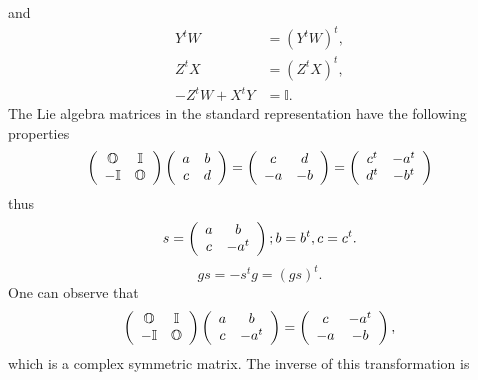 \documentclass[aps,preprint]{revtex4}%
\begin{document}
and
\begin{align}
Y^{t}W  &  =\left(  Y^{t}W\right)  ^{t},\\
Z^{t}X  &  =\left(  Z^{t}X\right)  ^{t},\\
-Z^{t}W+X^{t}Y  &  =\mathbb{I}.
\end{align}
The Lie algebra matrices in the standard representation have the following
properties
\begin{equation}
\left(
\begin{array}
[c]{cc}%
\mathbb{O} & \mathbb{I}\\
-\mathbb{I} & \mathbb{O}%
\end{array}
\right)  \left(
\begin{array}
[c]{cc}%
a & b\\
c & d
\end{array}
\right)  =\left(
\begin{array}
[c]{cc}%
c & d\\
-a & -b
\end{array}
\right)  =\left(
\begin{array}
[c]{cc}%
c^{t} & -a^{t}\\
d^{t} & -b^{t}%
\end{array}
\right)
\end{equation}
thus%
\begin{equation}
s=\left(
\begin{array}
[c]{cc}%
a & b\\
c & -a^{t}%
\end{array}
\right)  ;b=b^{t},c=c^{t}.
\end{equation}%
\begin{equation}
gs=-s^{t}g=\left(  gs\right)  ^{t}.
\end{equation}
One can observe that%
\begin{equation}
\left(
\begin{array}
[c]{cc}%
\mathbb{O} & \mathbb{I}\\
-\mathbb{I} & \mathbb{O}%
\end{array}
\right)  \left(
\begin{array}
[c]{cc}%
a & b\\
c & -a^{t}%
\end{array}
\right)  =\left(
\begin{array}
[c]{cc}%
c & -a^{t}\\
-a & -b
\end{array}
\right)  ,
\end{equation}
which is a complex symmetric matrix. The inverse of this transformation is
\end{document}
